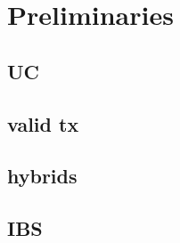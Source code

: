 \section{Preliminaries} 
  \subsection{UC}
  \subsection{valid tx}
  \subsection{hybrids}
  \subsection{IBS}
